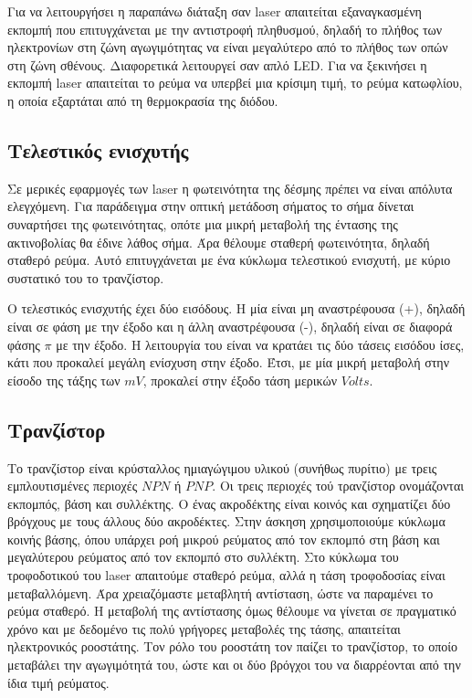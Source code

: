 \documentclass[a4paper,12pt,titlepage]{article}
\begin{document}
Για να λειτουργήσει η παραπάνω διάταξη σαν laser απαιτείται εξαναγκασμένη εκπομπή που επιτυγχάνεται με την αντιστροφή πληθυσμού, δηλαδή το πλήθος των ηλεκτρονίων στη ζώνη αγωγιμότητας να είναι μεγαλύτερο από το πλήθος των οπών στη ζώνη σθένους. Διαφορετικά λειτουργεί σαν απλό LED. Για να ξεκινήσει η εκπομπή laser απαιτείται το ρεύμα να υπερβεί μια κρίσιμη τιμή, το ρεύμα κατωφλίου, η οποία εξαρτάται από τη θερμοκρασία της διόδου.

\newpage
\subsection{Τελεστικός ενισχυτής}
Σε μερικές εφαρμογές των laser η φωτεινότητα της δέσμης πρέπει να είναι απόλυτα ελεγχόμενη. Για παράδειγμα στην οπτική μετάδοση σήματος το σήμα δίνεται συναρτήσει της φωτεινότητας, οπότε μια μικρή μεταβολή της έντασης της ακτινοβολίας θα έδινε λάθος σήμα. Άρα θέλουμε σταθερή φωτεινότητα, δηλαδή σταθερό ρεύμα. Αυτό επιτυγχάνεται με ένα κύκλωμα τελεστικού ενισχυτή, με κύριο συστατικό του το τρανζίστορ.

Ο τελεστικός ενισχυτής έχει δύο εισόδους. Η μία είναι μη αναστρέφουσα (+), δηλαδή είναι σε φάση με την έξοδο και η άλλη αναστρέφουσα (-), δηλαδή είναι σε διαφορά φάσης $\pi$ με την έξοδο. Η λειτουργία του είναι να κρατάει τις δύο τάσεις εισόδου ίσες, κάτι που προκαλεί μεγάλη ενίσχυση στην έξοδο. Έτσι, με μία μικρή μεταβολή στην είσοδο της τάξης των $mV$, προκαλεί στην έξοδο τάση μερικών $Volts$.

\subsection{Τρανζίστορ}
Το τρανζίστορ είναι κρύσταλλος ημιαγώγιμου υλικού (συνήθως πυρίτιο) με τρεις εμπλουτισμένες περιοχές $NPN$ ή $PNP$. Οι τρεις περιοχές τού τρανζίστορ ονομάζονται εκπομπός, βάση και συλλέκτης. Ο ένας ακροδέκτης είναι κοινός και σχηματίζει δύο βρόγχους με τους άλλους δύο ακροδέκτες. Στην άσκηση χρησιμοποιούμε κύκλωμα κοινής βάσης, όπου υπάρχει ροή μικρού ρεύματος από τον εκπομπό στη βάση και μεγαλύτερου ρεύματος από τον εκπομπό στο συλλέκτη.
Στο κύκλωμα του τροφοδοτικού του laser απαιτούμε σταθερό ρεύμα, αλλά η τάση τροφοδοσίας είναι μεταβαλλόμενη. Άρα χρειαζόμαστε μεταβλητή αντίσταση, ώστε να παραμένει το ρεύμα σταθερό. Η μεταβολή της αντίστασης όμως θέλουμε να γίνεται σε πραγματικό χρόνο και με δεδομένο τις πολύ γρήγορες μεταβολές της τάσης, απαιτείται ηλεκτρονικός ροοστάτης. Τον ρόλο του ροοστάτη τον παίζει το τρανζίστορ, το οποίο μεταβάλει την αγωγιμότητά του, ώστε και οι δύο βρόγχοι του να διαρρέονται από την ίδια τιμή ρεύματος.
\end{document}
